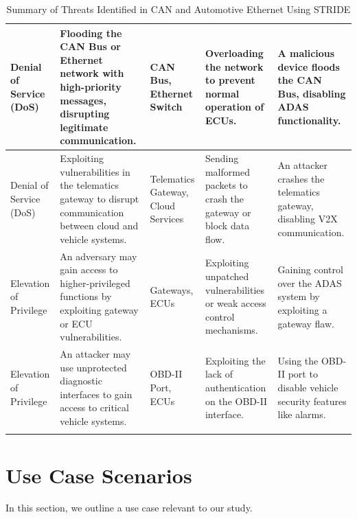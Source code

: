 \documentclass{report}
\begin{document}
\begin{longtable}{|>{\raggedright\arraybackslash}p{2cm}|>{\raggedright\arraybackslash}p{4cm}|>{\raggedright\arraybackslash}p{3cm}|>{\raggedright\arraybackslash}p{3cm}|>{\raggedright\arraybackslash}p{3cm}|}
    \hline
    Denial of Service (DoS) & Flooding the CAN Bus or Ethernet network with high-priority messages, disrupting legitimate communication. & CAN Bus, Ethernet Switch & Overloading the network to prevent normal operation of ECUs. & A malicious device floods the CAN Bus, disabling ADAS functionality. \\
    \hline
    Denial of Service (DoS) & Exploiting vulnerabilities in the telematics gateway to disrupt communication between cloud and vehicle systems. & Telematics Gateway, Cloud Services & Sending malformed packets to crash the gateway or block data flow. & An attacker crashes the telematics gateway, disabling V2X communication. \\
    \hline
    Elevation of Privilege & An adversary may gain access to higher-privileged functions by exploiting gateway or ECU vulnerabilities. & Gateways, ECUs & Exploiting unpatched vulnerabilities or weak access control mechanisms. & Gaining control over the ADAS system by exploiting a gateway flaw. \\
    \hline
    Elevation of Privilege & An attacker may use unprotected diagnostic interfaces to gain access to critical vehicle systems. & OBD-II Port, ECUs & Exploiting the lack of authentication on the OBD-II interface. & Using the OBD-II port to disable vehicle security features like alarms. \\
    \hline
    \caption{Summary of Threats Identified in CAN and Automotive Ethernet Using STRIDE}
    \label{tab:threat_analysis}
\end{longtable}

\section{Use Case Scenarios}

In this section, we outline a use case relevant to our study.
\end{document}
